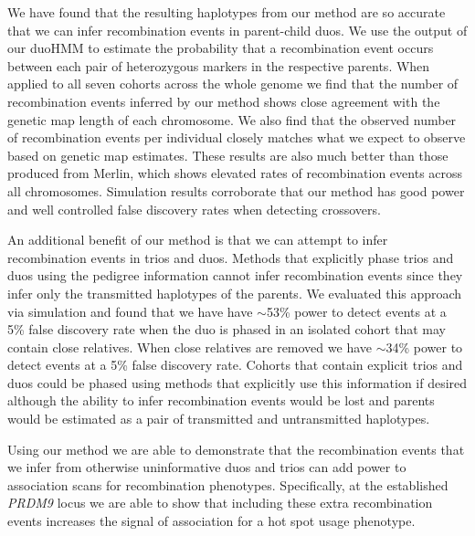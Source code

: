 We have found that the resulting haplotypes from our method are so accurate that we can infer recombination events in parent-child duos. We use the output of our duoHMM to estimate the probability that a recombination event occurs between each pair of heterozygous markers in the respective parents. When applied to all seven cohorts across the whole genome we find that the number of recombination events inferred by our method shows close agreement with the genetic map length of each chromosome. We also find that the observed number of recombination events per individual closely matches what we expect to observe based on genetic map estimates. These results are also much better than those produced from Merlin, which shows elevated rates of recombination events across all chromosomes. Simulation results corroborate that our method has good power and well controlled false discovery rates when detecting crossovers.

An additional benefit of our method is that we can attempt to infer recombination events in trios and duos. Methods that explicitly phase trios and duos using the pedigree information cannot infer recombination events since they infer only the transmitted haplotypes of the parents. We evaluated this approach via simulation and found  that we have have $\sim$53\% power to detect events at a 5\% false discovery rate when the duo is phased in an isolated cohort that may contain close relatives. When close relatives are removed we have  $\sim$34\% power to detect events at a 5\% false discovery rate. Cohorts that contain explicit trios and duos could be phased using methods that explicitly use this information if desired although the ability to infer recombination events would be lost and parents would be estimated as a pair of transmitted and untransmitted haplotypes. 

Using our method we are able to demonstrate that the recombination events that we infer from otherwise uninformative duos and trios can add power to association scans for recombination phenotypes. Specifically, at the established \emph{PRDM9} locus we are able to show that including these extra recombination events increases the signal of association for a hot spot usage phenotype.


